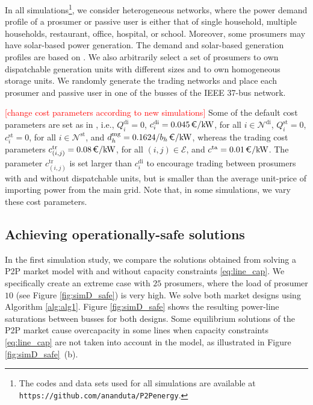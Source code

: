 \documentclass{IEEEtran}  %
\newcommand{\mc}{\mathcal}
\newcommand{\red}{\textcolor{red}}
\newcommand{\0}{\mathbf{0}}
\newcommand{\1}{\mathbf{1}}
\begin{document}
In all simulations\footnote{The codes and data sets used for all simulations are available at \texttt{https://github.com/ananduta/P2Penergy}.}, we consider heterogeneous networks, where the power demand profile of a prosumer or passive user is either that of single household, multiple households, restaurant, office, hospital, or school. Moreover, some prosumers may have solar-based power generation. The demand and solar-based generation profiles are based on \cite{jasm}.
%
We also arbitrarily select a set of prosumers to own dispatchable generation units with different sizes and to own homogeneous storage units. We randomly generate the trading networks and place each prosumer and passive user in one of the busses of the IEEE 37-bus network. 

\red{[change cost parameters according to new simulations]} Some of the default cost parameters are set as in \cite{atzeni2013}, i.e., $Q_i^{\mathrm{di}}=0$, $c_i^{\mathrm{di}}=0.045\,  \text{\euro/kW}$, for all $i \in \mc N^{\mathrm{di}}$, $Q_i^{\mathrm{st}}=0$, $c_i^{\mathrm{st}}=0$, for all $i \in \mc N^{\mathrm{st}}$, and $d_h^{\mathrm{mg}}=0.1624/b_h \, \text{\euro/kW}$, whereas the trading cost parameters $c_{(i,j)}^{\mathrm{tr}}=0.08 \,  \text{\euro/kW}$, for all $(i,j) \in \mc E$, and $c^{\mathrm{ta}}=0.01 \,  \text{\euro/kW}$. The parameter $c_{(i,j)}^{\mathrm{tr}}$ is set larger than $c_i^{\mathrm{di}}$ to encourage trading between prosumers with and without dispatchable units, but is smaller than the average unit-price of importing power from the main grid. Note that, in some simulations, we vary these cost parameters. 
%
%
\subsection{Achieving operationally-safe solutions}
In the first simulation study, we compare the solutions obtained from solving a P2P market model with and without capacity constraints \eqref{eq:line_cap}. We specifically create an extreme case with $25$ prosumers, where the load of  prosumer $10$ (see Figure \ref{fig:simD_safe}) is very high. We solve both market designs using Algorithm \ref{alg:alg1}. Figure \ref{fig:simD_safe} shows the resulting power-line saturations between busses for both designs. 
%
Some equilibrium solutions of the P2P market cause overcapacity in some lines when capacity constraints \eqref{eq:line_cap} are not taken into account in the model, as illustrated in Figure \ref{fig:simD_safe}~(b).
\end{document}
